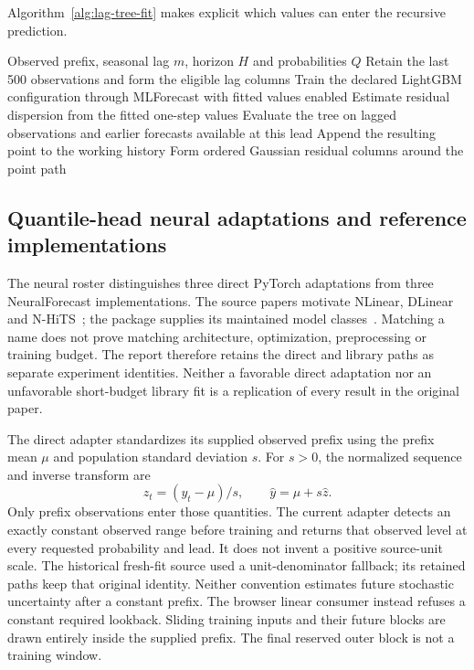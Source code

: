 Algorithm~\ref{alg:lag-tree-fit} makes explicit which values can enter
the recursive prediction.
\begin{algorithm}[htbp]
\caption{Fit the observed-prefix lag tree and extend it recursively over the common reserved block.}
\label{alg:lag-tree-fit}
\begin{algorithmic}[1]
\Require Observed prefix, seasonal lag $m$, horizon $H$ and probabilities $Q$
\State Retain the last 500 observations and form the eligible lag columns
\State Train the declared LightGBM configuration through MLForecast with fitted values enabled
\State Estimate residual dispersion from the fitted one-step values
  \State Evaluate the tree on lagged observations and earlier forecasts available at this lead
  \State Append the resulting point to the working history
\EndFor
\State Form ordered Gaussian residual columns around the point path
\end{algorithmic}
\end{algorithm}

\subsection{Quantile-head neural adaptations and reference implementations}
\label{sec:method-neural}
The neural roster distinguishes three direct PyTorch adaptations from three NeuralForecast implementations. The source papers motivate NLinear, DLinear and N-HiTS~\cite{zeng,challu}; the package supplies its maintained model classes~\cite{neuralforecast}. Matching a name does not prove matching architecture, optimization, preprocessing or training budget. The report therefore retains the direct and library paths as separate experiment identities. Neither a favorable direct adaptation nor an unfavorable short-budget library fit is a replication of every result in the original paper.

The direct adapter standardizes its supplied observed prefix using the prefix mean $\mu$ and population standard deviation $s$. For $s>0$, the normalized sequence and inverse transform are
\begin{equation}\label{eq:report-neural-scale}
z_t=(y_t-\mu)/s,\qquad \widehat y=\mu+s\widehat z.
\end{equation}
Only prefix observations enter those quantities. The current adapter detects an exactly constant observed range before training and returns that observed level at every requested probability and lead. It does not invent a positive source-unit scale. The historical fresh-fit source used a unit-denominator fallback; its retained paths keep that original identity. Neither convention estimates future stochastic uncertainty after a constant prefix. The browser linear consumer instead refuses a constant required lookback. Sliding training inputs and their future blocks are drawn entirely inside the supplied prefix. The final reserved outer block is not a training window.

